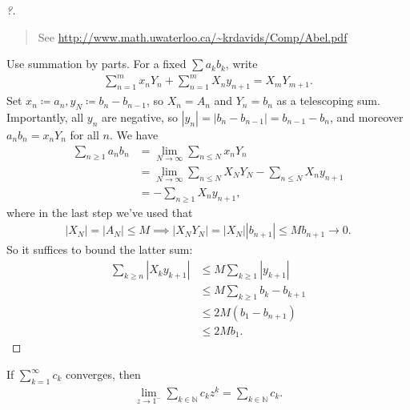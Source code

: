 \begin{proof}[?]

\begin{quote}
See \url{http://www.math.uwaterloo.ca/~krdavids/Comp/Abel.pdf}
\end{quote}

Use summation by parts. For a fixed \(\sum a_k b_k\), write
\begin{align*}
\sum_{n=1}^m x_n Y_n + \sum_{n=1}^m X_n y_{n+1} = X_m Y_{m+1}
.\end{align*}
Set \(x_n \coloneqq a_n, y_N \coloneqq b_n - b_{n-1}\), so \(X_n = A_n\)
and \(Y_n = b_n\) as a telescoping sum. Importantly, all \(y_n\) are
negative, so
\({\left\lvert {y_n} \right\rvert} = {\left\lvert {b_n - b_{n-1}} \right\rvert} = b_{n-1} - b_n\),
and moreover \(a_n b_n = x_n Y_n\) for all \(n\). We have
\begin{align*}
\sum_{n\geq 1} a_n b_n 
&= \lim_{N\to\infty} \sum_{n\leq N} x_n Y_n \\
&= \lim_{N\to\infty} \sum_{n\leq N} X_N Y_N - \sum_{n\leq N} X_n y_{n+1} \\
&= - \sum_{n\geq 1} X_n y_{n+1},
\end{align*}
where in the last step we've used that
\begin{align*}
{\left\lvert {X_N} \right\rvert} = {\left\lvert {A_N} \right\rvert}\leq M \implies {\left\lvert {X_N Y_{N} } \right\rvert} = {\left\lvert {X_N} \right\rvert} {\left\lvert {b_{n+1}} \right\rvert} \leq M b_{n+1} \to 0
.\end{align*}
So it suffices to bound the latter sum:
\begin{align*}
\sum_{k\geq n}{\left\lvert { X_k y_{k+1} } \right\rvert} 
&\leq M \sum_{k\geq 1} {\left\lvert {y_{k+1}} \right\rvert}\\
&\leq M \sum_{k\geq 1} b_{k} - b_{k+1} \\
&\leq 2M(b_1 - b_{n+1})\\
&\leq 2M b_1
.\end{align*}

\end{proof}

\begin{theorem}

If \(\sum_{k=1}^\infty c_k\) converges, then
\begin{align*}
\lim_{z\to 1^-} \sum_{k\in {\mathbb{N}}} c_k z^k = \sum_{k\in {\mathbb{N}}} c_k
.\end{align*}

\end{theorem}


